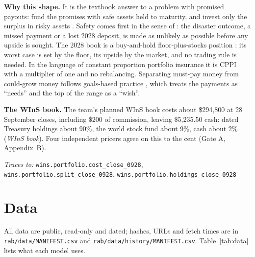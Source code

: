 \documentclass[11pt,a4paper]{article}
\newcommand{\nk}[1]{{\urlstyle{tt}\nolinkurl{#1}}}
\newcommand{\src}[1]{{\urlstyle{tt}\nolinkurl{#1}}}
\newcommand{\keys}[1]{\par{\footnotesize\raggedright\color{black!60}\textit{Traces to:} #1\par}}
\begin{document}
\textbf{Why this shape.} It is the textbook answer to a problem with promised payouts: fund the promises with
safe assets held to maturity, and invest only the surplus in risky assets
\citep{leibowitz1986dedicated,dybvig1999protect}. Safety comes first in the sense of \citet{roy1952safety}: the
disaster outcome, a missed payment or a lost 2028 deposit, is made as unlikely as possible before any upside is
sought. The 2028 book is a buy-and-hold floor-plus-stocks position \citep{perold1988dynamic}: its worst case is set
by the floor, its upside by the market, and no trading rule is needed. In the language of constant proportion
portfolio insurance \citep{black1992cppi} it is CPPI with a multiplier of one and no rebalancing. Separating
must-pay money from could-grow money follows goals-based practice
\citep{shefrin2000bpt,chhabra2005beyond,das2010mental,das2018gbwm}, which treats the payments as ``needs'' and the
top of the range as a ``wish''.

\textbf{The WInS book.} The team's planned WInS book costs about \$294,800 at 28 September closes, including \$200 of
commission, leaving \$5,235.50 cash: dated Treasury holdings about 90\%, the world stock fund about 9\%, cash about 2\%
(\emph{WInS book}). Four independent pricers agree on this to the cent (Gate A, Appendix~B).
\keys{\nk{wins.portfolio.cost_close_0928}, \nk{wins.portfolio.split_close_0928}, \nk{wins.portfolio.holdings_close_0928}}

\section{Data}\label{sec:data}

All data are public, read-only and dated; hashes, URLs and fetch times are in \src{rab/data/MANIFEST.csv} and
\texttt{rab/data/history/MANIFEST.csv}. Table~\ref{tab:data} lists what each model uses.
\end{document}
